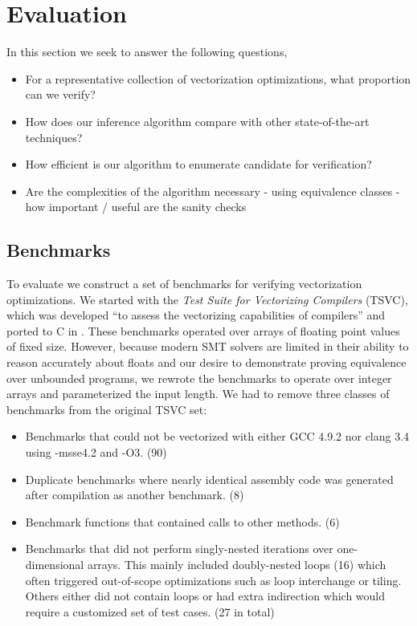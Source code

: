 \section{Evaluation}

In this section we seek to answer the following questions,

\begin{itemize}
\item For a representative collection of vectorization optimizations, what proportion can we verify?
\item How does our \bisim{} inference algorithm compare with other state-of-the-art techniques?
\item How efficient is our algorithm to enumerate candidate \bisimreps{} for verification?
\item Are the complexities of the algorithm necessary
        - using equivalence classes
        - how important / useful are the sanity checks
\end{itemize}

\subsection{Benchmarks}

To evaluate \tool{} we construct a set of benchmarks for verifying
vectorization optimizations. We started with the \emph{Test Suite
for Vectorizing Compilers} (TSVC), which was developed ``to assess
the vectorizing capabilities of compilers'' and ported to C in
\cite{TSVC}. These benchmarks operated over arrays of floating point
values of fixed size. However, because modern SMT solvers are limited
in their ability to reason accurately about floats and our desire to
demonstrate proving equivalence over unbounded programs, we rewrote
the benchmarks to operate over integer arrays and parameterized the
input length.  We had to remove three classes of benchmarks from the
original TSVC set:

\begin{itemize}
\item Benchmarks that could not be vectorized with either GCC 4.9.2
nor clang 3.4 using -msse4.2 and -O3. (90)
\item Duplicate benchmarks where nearly identical assembly code was
generated after compilation as another benchmark. (8)
\item Benchmark functions that contained calls to other methods. (6)
\item Benchmarks that did not perform singly-nested iterations over
one-dimensional arrays. This mainly included doubly-nested loops
(16) which often triggered out-of-scope optimizations such as loop
interchange or tiling. Others either did not contain loops or had
extra indirection which would require a customized set of test cases.
(27 in total)
\end{itemize}

